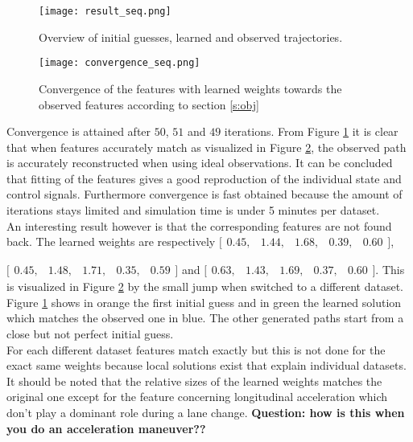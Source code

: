 \begin{figure}[h!]
	\centering
	\texttt{[image: result\_seq.png]}
	\caption{Overview of initial guesses, learned and observed trajectories.} 
	\label{fig:result_seq}
\end{figure}

\begin{figure}[h!]
	\centering
	\texttt{[image: convergence\_seq.png]}
	\caption{Convergence of the features with learned weights towards the observed features according to section \ref{s:obj}}
	\label{fig:convergence_seq}
\end{figure}

Convergence is attained after $50$, $51$ and $49$ iterations. From Figure \ref{fig:result_seq} it is clear that when features accurately match as visualized in Figure \ref{fig:convergence_seq}, the observed path is accurately reconstructed when using ideal observations. It can be concluded that fitting of the features gives a good reproduction of the individual state and control signals. Furthermore convergence is fast obtained because the amount of iterations stays limited and simulation time is under 5 minutes per dataset.\\

 An interesting result however is that the corresponding features are not found back. The learned weights are respectively $\bigl[ \begin{smallmatrix} 0.45  ,&1.44 ,&1.68 ,&0.39,&0.60\end{smallmatrix}\bigr]$, 
 
 $\bigl[ \begin{smallmatrix} 0.45  ,&1.48 ,&1.71 ,&0.35,&0.59\end{smallmatrix}\bigr]$ and $\bigl[ \begin{smallmatrix} 0.63  ,&1.43 ,&1.69 ,&0.37,&0.60\end{smallmatrix}\bigr]$. This is visualized in Figure \ref{fig:convergence_seq} by the small jump when switched to a different dataset. Figure \ref{fig:result_seq} shows in orange the first initial guess and in green the learned solution which matches the observed one in blue. The other generated paths start from a close but not perfect initial guess.\\
 
 For each different dataset features match exactly but this is not done for the exact same weights because local solutions exist that explain individual datasets. It should be noted that the relative sizes of the learned weights matches the original one except for the feature concerning longitudinal acceleration which don't play a dominant role during a lane change. \textbf{Question: how is this when you do an acceleration maneuver??}\\
 
